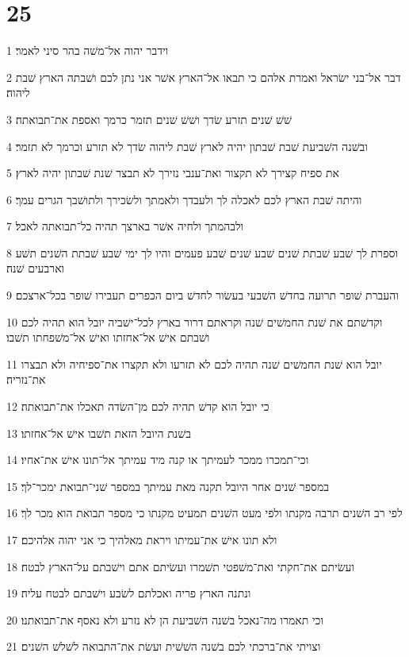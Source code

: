 \chapter{25}

\par 1 וידבר יהוה אל־משׁה בהר סיני לאמר׃
\par 2 דבר אל־בני ישׂראל ואמרת אלהם כי תבאו אל־הארץ אשׁר אני נתן לכם ושׁבתה הארץ שׁבת ליהוה׃
\par 3 שׁשׁ שׁנים תזרע שׂדך ושׁשׁ שׁנים תזמר כרמך ואספת את־תבואתה׃
\par 4 ובשׁנה השׁביעת שׁבת שׁבתון יהיה לארץ שׁבת ליהוה שׂדך לא תזרע וכרמך לא תזמר׃
\par 5 את ספיח קצירך לא תקצור ואת־ענבי נזירך לא תבצר שׁנת שׁבתון יהיה לארץ׃
\par 6 והיתה שׁבת הארץ לכם לאכלה לך ולעבדך ולאמתך ולשׂכירך ולתושׁבך הגרים עמך׃
\par 7 ולבהמתך ולחיה אשׁר בארצך תהיה כל־תבואתה לאכל׃
\par 8 וספרת לך שׁבע שׁבתת שׁנים שׁבע שׁנים שׁבע פעמים והיו לך ימי שׁבע שׁבתת השׁנים תשׁע וארבעים שׁנה׃
\par 9 והעברת שׁופר תרועה בחדשׁ השׁבעי בעשׂור לחדשׁ ביום הכפרים תעבירו שׁופר בכל־ארצכם׃
\par 10 וקדשׁתם את שׁנת החמשׁים שׁנה וקראתם דרור בארץ לכל־ישׁביה יובל הוא תהיה לכם ושׁבתם אישׁ אל־אחזתו ואישׁ אל־משׁפחתו תשׁבו׃
\par 11 יובל הוא שׁנת החמשׁים שׁנה תהיה לכם לא תזרעו ולא תקצרו את־ספיחיה ולא תבצרו את־נזריה׃
\par 12 כי יובל הוא קדשׁ תהיה לכם מן־השׂדה תאכלו את־תבואתה׃
\par 13 בשׁנת היובל הזאת תשׁבו אישׁ אל־אחזתו׃
\par 14 וכי־תמכרו ממכר לעמיתך או קנה מיד עמיתך אל־תונו אישׁ את־אחיו׃
\par 15 במספר שׁנים אחר היובל תקנה מאת עמיתך במספר שׁני־תבואת ימכר־לך׃
\par 16 לפי רב השׁנים תרבה מקנתו ולפי מעט השׁנים תמעיט מקנתו כי מספר תבואת הוא מכר לך׃
\par 17 ולא תונו אישׁ את־עמיתו ויראת מאלהיך כי אני יהוה אלהיכם׃
\par 18 ועשׂיתם את־חקתי ואת־משׁפטי תשׁמרו ועשׂיתם אתם וישׁבתם על־הארץ לבטח׃
\par 19 ונתנה הארץ פריה ואכלתם לשׂבע וישׁבתם לבטח עליה׃
\par 20 וכי תאמרו מה־נאכל בשׁנה השׁביעת הן לא נזרע ולא נאסף את־תבואתנו׃
\par 21 וצויתי את־ברכתי לכם בשׁנה השׁשׁית ועשׂת את־התבואה לשׁלשׁ השׁנים׃
